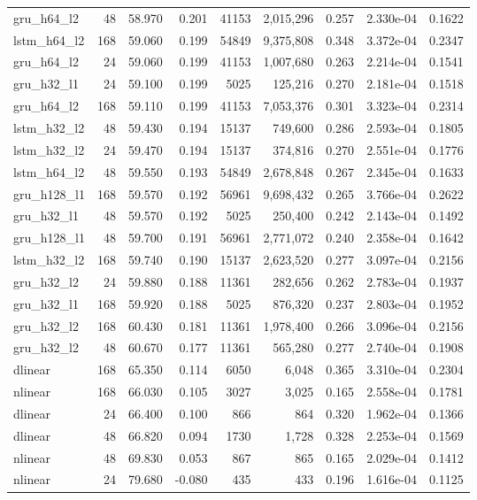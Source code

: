 \begin{table}[htbp]
\begin{tabular}{lrrrrrrrr}
gru\_h64\_l2 & 48 & 58.970 & 0.201 & 41153 & 2,015,296 & 0.257 & 2.330e-04 & 0.1622 \\
lstm\_h64\_l2 & 168 & 59.060 & 0.199 & 54849 & 9,375,808 & 0.348 & 3.372e-04 & 0.2347 \\
gru\_h64\_l2 & 24 & 59.060 & 0.199 & 41153 & 1,007,680 & 0.263 & 2.214e-04 & 0.1541 \\
gru\_h32\_l1 & 24 & 59.100 & 0.199 & 5025 & 125,216 & 0.270 & 2.181e-04 & 0.1518 \\
gru\_h64\_l2 & 168 & 59.110 & 0.199 & 41153 & 7,053,376 & 0.301 & 3.323e-04 & 0.2314 \\
lstm\_h32\_l2 & 48 & 59.430 & 0.194 & 15137 & 749,600 & 0.286 & 2.593e-04 & 0.1805 \\
lstm\_h32\_l2 & 24 & 59.470 & 0.194 & 15137 & 374,816 & 0.270 & 2.551e-04 & 0.1776 \\
lstm\_h64\_l2 & 48 & 59.550 & 0.193 & 54849 & 2,678,848 & 0.267 & 2.345e-04 & 0.1633 \\
gru\_h128\_l1 & 168 & 59.570 & 0.192 & 56961 & 9,698,432 & 0.265 & 3.766e-04 & 0.2622 \\
gru\_h32\_l1 & 48 & 59.570 & 0.192 & 5025 & 250,400 & 0.242 & 2.143e-04 & 0.1492 \\
gru\_h128\_l1 & 48 & 59.700 & 0.191 & 56961 & 2,771,072 & 0.240 & 2.358e-04 & 0.1642 \\
lstm\_h32\_l2 & 168 & 59.740 & 0.190 & 15137 & 2,623,520 & 0.277 & 3.097e-04 & 0.2156 \\
gru\_h32\_l2 & 24 & 59.880 & 0.188 & 11361 & 282,656 & 0.262 & 2.783e-04 & 0.1937 \\
gru\_h32\_l1 & 168 & 59.920 & 0.188 & 5025 & 876,320 & 0.237 & 2.803e-04 & 0.1952 \\
gru\_h32\_l2 & 168 & 60.430 & 0.181 & 11361 & 1,978,400 & 0.266 & 3.096e-04 & 0.2156 \\
gru\_h32\_l2 & 48 & 60.670 & 0.177 & 11361 & 565,280 & 0.277 & 2.740e-04 & 0.1908 \\
dlinear & 168 & 65.350 & 0.114 & 6050 & 6,048 & 0.365 & 3.310e-04 & 0.2304 \\
nlinear & 168 & 66.030 & 0.105 & 3027 & 3,025 & 0.165 & 2.558e-04 & 0.1781 \\
dlinear & 24 & 66.400 & 0.100 & 866 & 864 & 0.320 & 1.962e-04 & 0.1366 \\
dlinear & 48 & 66.820 & 0.094 & 1730 & 1,728 & 0.328 & 2.253e-04 & 0.1569 \\
nlinear & 48 & 69.830 & 0.053 & 867 & 865 & 0.165 & 2.029e-04 & 0.1412 \\
nlinear & 24 & 79.680 & -0.080 & 435 & 433 & 0.196 & 1.616e-04 & 0.1125 \\
\bottomrule
\end{tabular}
\end{table}
